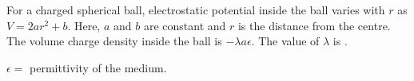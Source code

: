 \item For a charged spherical ball, electrostatic potential inside the ball varies with \( r \) as \( V = 2ar^2 + b \). Here, \( a \) and \( b \) are constant and \( r \) is the distance from the centre. The volume charge density inside the ball is \(-\lambda a \epsilon\). The value of \(\lambda \) is \underline{\hspace{2.5cm}}.   

\(\epsilon = \) permittivity of the medium.